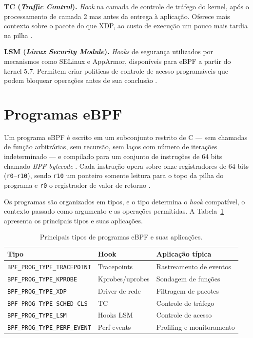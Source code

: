 \textbf{TC (\textit{Traffic Control}).}
\textit{Hook} na camada de controle de tráfego do kernel, após o processamento
de camada 2 mas antes da entrega à aplicação.
Oferece mais contexto sobre o pacote do que XDP, ao custo de execução um pouco
mais tardia na pilha \cite{gregg2019}.

\textbf{LSM (\textit{Linux Security Module}).}
\textit{Hooks} de segurança utilizados por mecanismos como SELinux e AppArmor,
disponíveis para eBPF a partir do kernel 5.7.
Permitem criar políticas de controle de acesso programáveis que podem bloquear
operações antes de sua conclusão \cite{linuxkernel2024}.

\section{Programas eBPF}

Um programa eBPF é escrito em um subconjunto restrito de C — sem chamadas de
função arbitrárias, sem recursão, sem laços com número de iterações
indeterminado — e compilado para um conjunto de instruções de 64 bits chamado
\textit{BPF bytecode} \cite{linuxkernel2024}.
Cada instrução opera sobre onze registradores de 64 bits (\texttt{r0}--\texttt{r10}),
sendo \texttt{r10} um ponteiro somente leitura para o topo da pilha do programa
e \texttt{r0} o registrador de valor de retorno \cite{gregg2019}.

Os programas são organizados em tipos, e o tipo determina o \textit{hook}
compatível, o contexto passado como argumento e as operações permitidas.
A Tabela~\ref{tab:bpf-types} apresenta os principais tipos e suas aplicações.

\begin{table}[ht]
\centering
\caption{Principais tipos de programas eBPF e suas aplicações.}
\label{tab:bpf-types}
\begin{tabular}{lll}
\toprule
\textbf{Tipo}              & \textbf{Hook}              & \textbf{Aplicação típica}       \\
\midrule
\texttt{BPF\_PROG\_TYPE\_TRACEPOINT}   & Tracepoints          & Rastreamento de eventos         \\
\texttt{BPF\_PROG\_TYPE\_KPROBE}       & Kprobes/uprobes      & Sondagem de funções             \\
\texttt{BPF\_PROG\_TYPE\_XDP}          & Driver de rede       & Filtragem de pacotes            \\
\texttt{BPF\_PROG\_TYPE\_SCHED\_CLS}   & TC                   & Controle de tráfego             \\
\texttt{BPF\_PROG\_TYPE\_LSM}          & Hooks LSM            & Controle de acesso              \\
\texttt{BPF\_PROG\_TYPE\_PERF\_EVENT}  & Perf events          & Profiling e monitoramento       \\
\bottomrule
\end{tabular}
\end{table}

